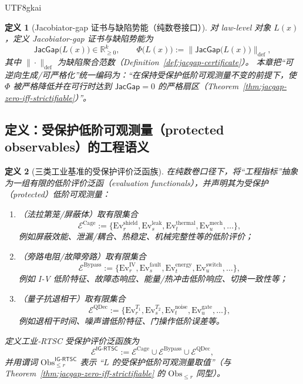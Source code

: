 \documentclass[12pt]{article}
\newtheorem{definition}{定义}[section]
\newcommand{\JacGap}{\ensuremath{\mathsf{JacGap}}}
\begin{document}
\begin{CJK*}{UTF8}{gkai}
\begin{definition}[Jacobiator-gap 证书与缺陷势能（纯数卷接口）]
\label{def:ig-jacgap-defect}
对 law-level 对象 $L(x)$，定义 Jacobiator-gap 证书与缺陷势能为
\[
\JacGap\bigl(L(x)\bigr)\in \mathbb{R}_{\ge 0}^k,
\qquad
\Phi\bigl(L(x)\bigr):=\bigl\|\JacGap\bigl(L(x)\bigr)\bigr\|_{\mathrm{def}},
\]
其中 $\|\cdot\|_{\mathrm{def}}$ 为缺陷聚合范数（Definition~\ref{def:jacgap-certificate}）。
本章把“可逆向生成/可严格化”统一编码为：“在保持受保护低阶可观测量不变的前提下，使 $\Phi$ 被严格降低并在可行时达到 $\JacGap=0$ 的严格扇区（Theorem~\ref{thm:jacgap-zero-iff-strictifiable}）”。
\end{definition}

\subsection{定义：受保护低阶可观测量（protected observables）的工程语义}

\begin{definition}[三类工业基准的受保护评价泛函族]
\label{def:ig-protected-observables}
在纯数卷口径下，将“工程指标”抽象为一组有限的低阶评价泛函（evaluation functionals），并声明其为受保护（protected）低阶可观测量：
\begin{enumerate}
  \item（法拉第笼/屏蔽体）取有限集合
  \[
  \mathcal{E}^{\mathrm{Cage}}
  :=
  \{\mathrm{Ev}^{\mathrm{shield}}_r,\mathrm{Ev}^{\mathrm{leak}}_s,\mathrm{Ev}^{\mathrm{thermal}}_t,\mathrm{Ev}
    ^{\mathrm{mech}}_u,\ldots\},
  \]
  例如屏蔽效能、泄漏/耦合、热稳定、机械完整性等的低阶评价；
  \item（旁路电阻/故障旁路）取有限集合
  \[
  \mathcal{E}^{\mathrm{Bypass}}
  :=
  \{\mathrm{Ev}^{\mathrm{IV}}_r,\mathrm{Ev}^{\mathrm{fault}}_s,\mathrm{Ev}^{\mathrm{energy}}_t,\mathrm{Ev}
    ^{\mathrm{switch}}_u,\ldots\},
  \]
  例如 I‑V 低阶特征、故障态响应、能量/热冲击低阶响应、切换一致性等；
  \item（量子抗退相干）取有限集合
  \[
  \mathcal{E}^{\mathrm{QDec}}
  :=
  \{\mathrm{Ev}^{T_1}_r,\mathrm{Ev}^{T_2}_s,\mathrm{Ev}^{\mathrm{noise}}_t,\mathrm{Ev}^{\mathrm{gate}}_u,\ldots\},
  \]
  例如退相干时间、噪声谱低阶特征、门操作低阶误差等。
\end{enumerate}
定义工业‑RTSC 受保护评价泛函族为
\[
\mathcal{E}^{\textsf{IG-RTSC}}
:=
\mathcal{E}^{\mathrm{Cage}}
\cup
\mathcal{E}^{\mathrm{Bypass}}
\cup
\mathcal{E}^{\mathrm{QDec}},
\]
并用谓词 $\mathrm{Obs}_{\le r}^{\textsf{IG-RTSC}}$ 表示 “$L$ 的受保护低阶可观测量取值”（与 Theorem~\ref{thm:jacgap-zero-iff-strictifiable} 的
  $\mathrm{Obs}_{\le r}$ 同型）。
\end{definition}


\end{CJK*}
\end{document}
